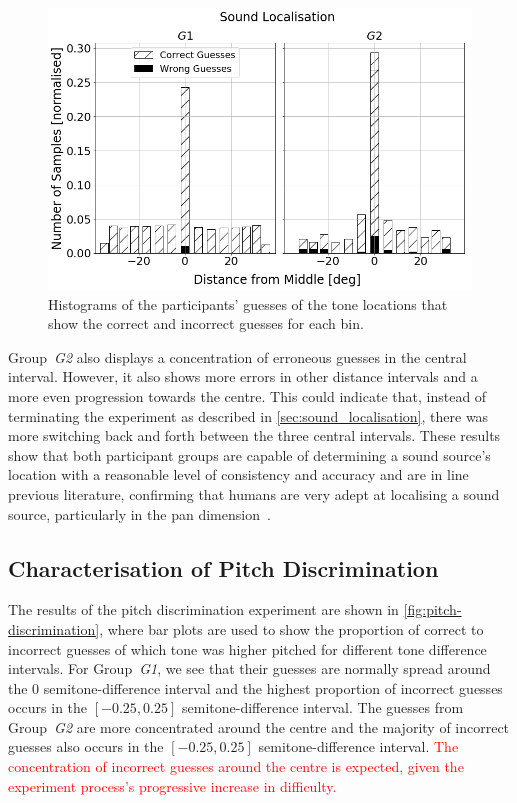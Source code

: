 \documentclass[acmsmall]{acmart}
\newcommand\hl[1]{\textcolor{red}{#1}}
\begin{document}
\begin{figure}
  \centering
  \includegraphics[width=0.8\columnwidth]{figures/sound_localisation.png}
  \caption{Histograms of the participants' guesses of the tone locations that show the correct and incorrect guesses for each bin. }\label{fig:sound-localisation}
\end{figure}

Group~\textit{G2} also displays a concentration of erroneous guesses in the central interval.
However, it also shows more errors in other distance intervals and a more even progression towards the centre.
This could indicate that, instead of terminating the experiment as described in \cref{sec:sound_localisation}, there was more switching back and forth between the three central intervals. 
These results show that both participant groups are capable of determining a sound source's location with a reasonable level of consistency and accuracy and are in line previous literature, confirming that humans are very adept at localising a sound source, particularly in the pan dimension~\cite{wersenyi2003localization}. 

\subsection{Characterisation of Pitch Discrimination}

The results of the pitch discrimination experiment are shown in \cref{fig:pitch-discrimination}, where bar plots are used to show the proportion of correct to incorrect guesses of which tone was higher pitched for different tone difference intervals. 
For Group~\textit{G1}, we see that their guesses are normally spread around the 0 semitone-difference interval and the highest proportion of incorrect guesses occurs in the $[-0.25, 0.25]$ semitone-difference interval. 
The guesses from Group~\textit{G2} are more concentrated around the centre and the majority of incorrect guesses also occurs in the $[-0.25, 0.25]$ semitone-difference interval.
\hl{The concentration of incorrect guesses around the centre is expected, given the experiment process's progressive increase in difficulty.}
\end{document}
